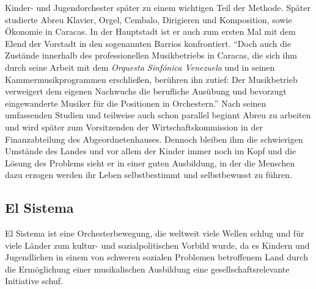 Kinder- und Jugendorchester später zu einem wichtigen Teil der Methode. Später
studierte Abreu Klavier, Orgel, Cembalo, Dirigieren und Komposition, sowie
Ökonomie in Caracas. In der Hauptstadt ist er auch zum ersten Mal mit dem Elend
der Vorstadt in den sogenannten Barrios konfrontiert. \enquote{Doch auch die
Zustände innerhalb des professionellen Musikbetriebs in Caracas, die sich ihm
durch seine Arbeit mit dem \emph{Orquesta Sinfónica Venezuela} und in seinen
Kammermusikprogrammen erschließen, berühren ihn zutief: Der Musikbetrieb
verweigert dem eigenen Nachwuchs die berufliche Ausübung und bevorzugt
eingewanderte Musiker für die Positionen in
Orchestern.}\autocite[28]{kaufmann:el_sistema} Nach seinen umfassenden Studien
und teilweise auch schon parallel beginnt Abreu zu arbeiten und wird später zum
Vorsitzenden der Wirtschaftskommission in der Finanzabteilung des
Abgeordnetenhauses. Dennoch bleiben ihm die schwierigen Umstände des Landes und
vor allem der Kinder immer noch im Kopf und die Lösung des Problems sieht er in
einer guten Ausbildung, in der die Menschen dazu erzogen werden ihr Leben
selbstbestimmt und selbstbewusst zu führen.\autocite[31]{kaufmann:el_sistema} 



\subsection{El Sistema}
El Sistema ist eine Orchesterbewegung, die weltweit viele Wellen schlug und für
viele Länder zum kultur- und sozialpolitischen Vorbild wurde, da es Kindern und
Jugendlichen in einem von schweren sozialen Problemen betroffenem Land durch die
Ermöglichung einer musikalischen Ausbildung eine gesellschaftsrelevante
Initiative schuf. 

